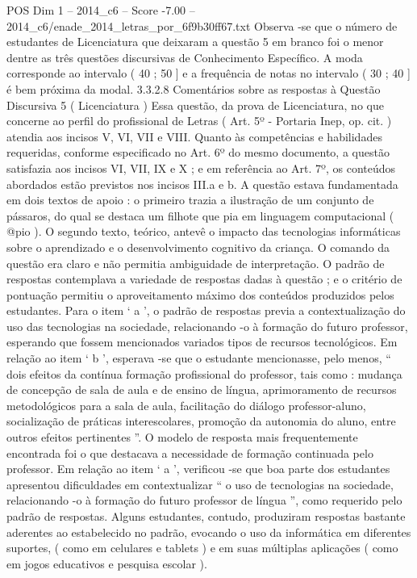 \begin{textsample}{POS Dim 1 – 2014\_c6 – Score -7.00 – 2014\_c6/enade\_2014\_letras\_por\_6f9b30ff67.txt}
Observa -se que o número de estudantes de Licenciatura que deixaram a questão 5 em branco foi o menor dentre as três questões discursivas de Conhecimento Específico.
A moda corresponde ao intervalo ( 40 ; 50 ] e a frequência de notas no intervalo ( 30 ; 40 ] é bem próxima da modal. 3.3.2.8 Comentários sobre as respostas à Questão Discursiva 5 ( Licenciatura ) Essa questão, da prova de Licenciatura, no que concerne ao perfil do profissional de Letras ( Art. 5º - Portaria Inep, op. cit. ) atendia aos incisos V, VI, VII e VIII.
Quanto às competências e habilidades requeridas, conforme especificado no Art. 6º do mesmo documento, a questão satisfazia aos incisos VI, VII, IX e X ; e em referência ao Art. 7º, os conteúdos abordados estão previstos nos incisos III.a e b.
A questão estava fundamentada em dois textos de apoio : o primeiro trazia a ilustração de um conjunto de pássaros, do qual se destaca um filhote que pia em linguagem computacional ( @pio ).
O segundo texto, teórico, antevê o impacto das tecnologias informáticas sobre o aprendizado e o desenvolvimento cognitivo da criança.
O comando da questão era claro e não permitia ambiguidade de interpretação.
O padrão de respostas contemplava a variedade de respostas dadas à questão ; e o critério de pontuação permitiu o aproveitamento máximo dos conteúdos produzidos pelos estudantes.
Para o item ‘ a ’, o padrão de respostas previa a contextualização do uso das tecnologias na sociedade, relacionando -o à formação do futuro professor, esperando que fossem mencionados variados tipos de recursos tecnológicos.
Em relação ao item ‘ b ’, esperava -se que o estudante mencionasse, pelo menos, “ dois efeitos da contínua formação profissional do professor, tais como : mudança de concepção de sala de aula e de ensino de língua, aprimoramento de recursos metodológicos para a sala de aula, facilitação do diálogo professor-aluno, socialização de práticas interescolares, promoção da autonomia do aluno, entre outros efeitos pertinentes ”.
O modelo de resposta mais frequentemente encontrada foi o que destacava a necessidade de formação continuada pelo professor.
Em relação ao item ‘ a ’, verificou -se que boa parte dos estudantes apresentou dificuldades em contextualizar “ o uso de tecnologias na sociedade, relacionando -o à formação do futuro professor de língua ”, como requerido pelo padrão de respostas.
Alguns estudantes, contudo, produziram respostas bastante aderentes ao estabelecido no padrão, evocando o uso da informática em diferentes suportes, ( como em celulares e tablets ) e em suas múltiplas aplicações ( como em jogos educativos e pesquisa escolar ).

\end{textsample}

